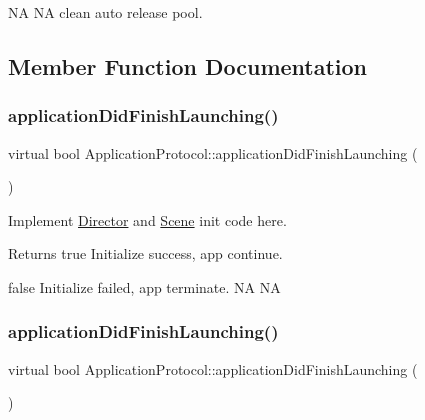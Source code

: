 NA  NA clean auto release pool. 

\subsection{Member Function Documentation}
\mbox{\label{classApplicationProtocol_a8f44759d0b686ababcbb15d106b08ca4}} 
\subsubsection{\texorpdfstring{application\+Did\+Finish\+Launching()}{applicationDidFinishLaunching()}\hspace{0.1cm}{\footnotesize\ttfamily [1/2]}}
{\footnotesize\ttfamily virtual bool Application\+Protocol\+::application\+Did\+Finish\+Launching (\begin{DoxyParamCaption}{ }\end{DoxyParamCaption})\hspace{0.3cm}{\ttfamily [pure virtual]}}



Implement \hyperlink{classDirector}{Director} and \hyperlink{classScene}{Scene} init code here. 

\begin{DoxyReturn}{Returns}
true Initialize success, app continue. 

false Initialize failed, app terminate.  NA  NA 
\end{DoxyReturn}
\mbox{\label{classApplicationProtocol_a8f44759d0b686ababcbb15d106b08ca4}} 
\subsubsection{\texorpdfstring{application\+Did\+Finish\+Launching()}{applicationDidFinishLaunching()}\hspace{0.1cm}{\footnotesize\ttfamily [2/2]}}
{\footnotesize\ttfamily virtual bool Application\+Protocol\+::application\+Did\+Finish\+Launching (\begin{DoxyParamCaption}{ }\end{DoxyParamCaption})\hspace{0.3cm}{\ttfamily [pure virtual]}}



